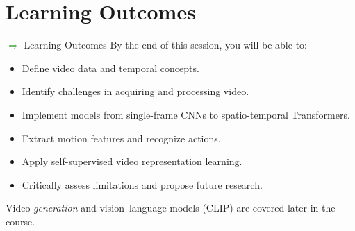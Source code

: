 \section{Learning Outcomes}
\begin{frame}[allowframebreaks]{\textcolor{green}{$\Rightarrow$} Learning Outcomes}
    By the end of this session, you will be able to:
    \begin{itemize}
        \item Define video data and temporal concepts.
        \item Identify challenges in acquiring and processing video.
        \item Implement models from single-frame CNNs to spatio-temporal Transformers.
        \item Extract motion features and recognize actions.
        \item Apply self-supervised video representation learning.
        \item Critically assess limitations and propose future research.
    \end{itemize}
    \vspace{0.5em}
    {\footnotesize Video \emph{generation} and vision--language models (CLIP) are covered later in the course.}
\end{frame}
